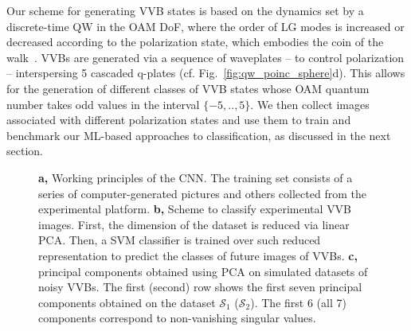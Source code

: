 Our scheme for generating \ac{VVB} states is based on the dynamics set by a discrete-time QW in the OAM DoF, where the order of \ac{LG} modes is increased or decreased according to the polarization state, which embodies the coin of the walk~\cite{zhang2010implementation,goyal2013implementing,cardano2015quantum,innocenti2017quantum,giordani2019experimental}. 
\ac{VVB}s are generated via a sequence of waveplates -- to control polarization -- interspersing 5 cascaded q-plates (cf. Fig.~\ref{fig:qw_poinc_sphere}d). This allows for the generation of different classes of VVB states whose {OAM quantum number} takes odd values in the interval $\{-5,..,5\}$.
We then collect images associated with different polarization states and use them to train and benchmark our \ac{ML}-based approaches to classification, as discussed in the next section. 

\begin{figure}[b]
    \centering
    \caption{
    {\bf a,} 
    Working principles of the \ac{CNN}. The training set consists of a series of computer-generated pictures and others collected from the experimental platform.
    {\bf b,} 
    Scheme to classify experimental \ac{VVB} images. First, the dimension of the dataset is reduced via linear PCA. Then, a SVM classifier is trained over 
    such reduced representation 
    to predict the classes of future images of \ac{VVB}s. {\bf c,} principal components obtained using \ac{PCA} on simulated datasets of noisy \acp{VVB}. The first (second) row shows the first seven principal components obtained on the dataset $\mathcal S_1$ ($\mathcal S_2$). 
    The first 6 (all 7) components correspond to non-vanishing singular values. 
    }
    \label{fig:class_techniques}
\end{figure}




